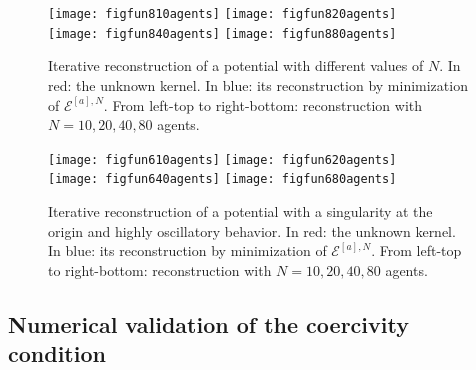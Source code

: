 \begin{figure}[h!]
\begin{center}
\hspace{-0.7cm}\texttt{[image: figfun810agents]}\hspace{-0.9cm}
\texttt{[image: figfun820agents]}\\
\hspace{-0.7cm}\texttt{[image: figfun840agents]}\hspace{-0.9cm}
\texttt{[image: figfun880agents]}
\end{center}
\caption{Iterative reconstruction of a potential with different values of $N$. In red: the unknown kernel. In blue: its reconstruction by minimization of $\mathcal{E}^{[a],N}$. From left-top to right-bottom: reconstruction with $N = 10, 20, 40, 80$ agents. }\label{variableN}
\end{figure}

\begin{figure}[h!]
\begin{center}
\hspace{-0.7cm}\texttt{[image: figfun610agents]}\hspace{-0.9cm}
\texttt{[image: figfun620agents]}\\
\hspace{-0.7cm}\texttt{[image: figfun640agents]}\hspace{-0.9cm}
\texttt{[image: figfun680agents]}
\end{center}
\caption{Iterative reconstruction of a potential with a singularity at the origin and highly oscillatory behavior. In red: the unknown kernel. In blue: its reconstruction by minimization of $\mathcal{E}^{[a],N}$. From left-top to right-bottom: reconstruction with $N = 10, 20, 40, 80$ agents.}\label{variableN2}
\end{figure}

\subsection{Numerical validation of the coercivity condition}\label{numcoer}

